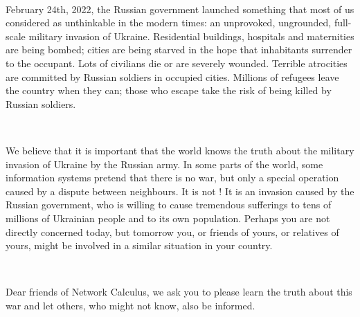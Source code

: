 ~\\
\par\indent February 24th, 2022, the Russian government launched something that most of us considered as unthinkable in the modern times: an unprovoked, ungrounded, full-scale military invasion of Ukraine. Residential buildings, hospitals and maternities are being bombed; cities are being starved in the hope that inhabitants surrender to the occupant. Lots of civilians die or are severely wounded. Terrible atrocities are committed by Russian soldiers in occupied cities. Millions of refugees leave the country when they can; those who escape take the risk of being killed by Russian soldiers.

~\\
\par\indent We believe that it is important that the world knows the truth about the military invasion of Ukraine by the Russian army. In some parts of the world, some information systems pretend that there is no war, but only a special operation caused by a dispute between neighbours. It is not ! It is an invasion caused by the Russian government, who is willing to cause tremendous sufferings to tens of millions of Ukrainian people and to its own population. Perhaps you are not directly concerned today, but tomorrow you, or friends of yours, or relatives of yours, might be involved in a similar situation in your country.

~\\
\par\indent Dear friends of Network Calculus, we ask you to please learn the truth about this war and let others, who might not know, also be informed.
~\\ 